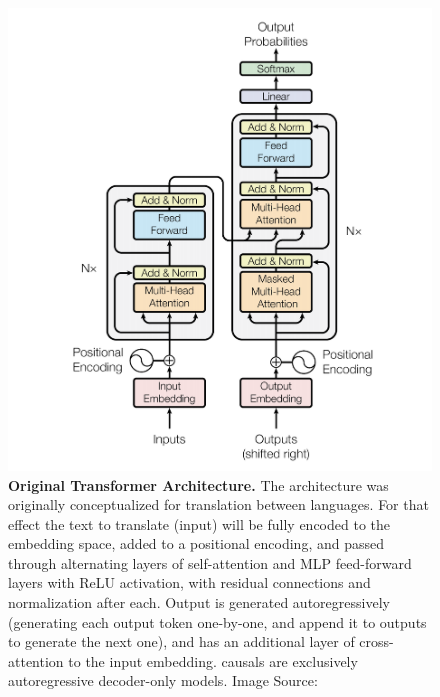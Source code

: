 \begin{figure}[!htb]
    \begin{centering}
        \includegraphics[height=0.5\textheight]{img/transformer}
        \caption[Original Transformer Architecture]{\textbf{Original Transformer Architecture.}
        The architecture was originally conceptualized for translation between languages.
        For that effect the text to translate (input) will be fully encoded to the embedding space, added to a positional encoding, and passed through alternating layers of self-attention and \gls{MLP} feed-forward layers with \gls{ReLU} activation, with residual connections and normalization after each.
        Output is generated autoregressively (generating each output token one-by-one, and append it to outputs to generate the next one), and has an additional layer of cross-attention to the input embedding.
        \Glspl{causal} are exclusively autoregressive decoder-only models.
        Image Source: \cite{vaswani_attention_2017}
        }
        \label{fig:transformer}
    \end{centering}
\end{figure}

